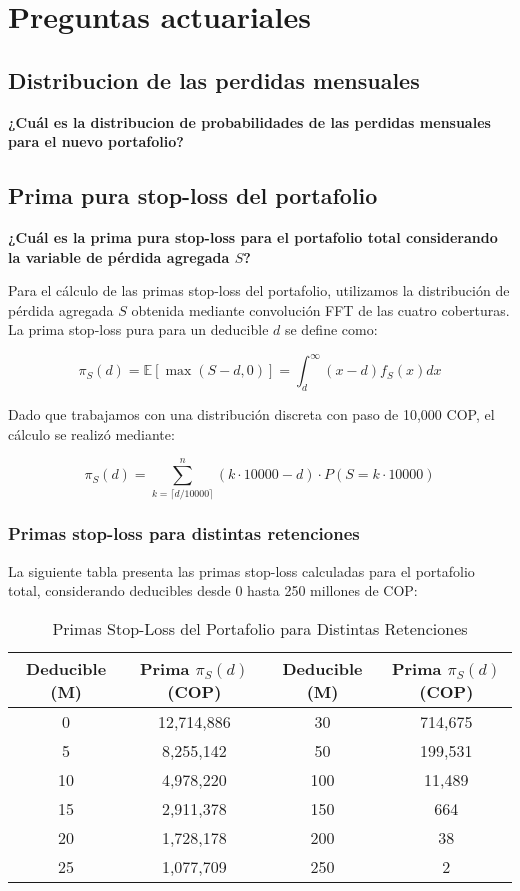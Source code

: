 \section{Preguntas actuariales}

\subsection{Distribucion de las perdidas mensuales}

\textbf{¿Cuál es la distribucion de probabilidades de las perdidas mensuales para el nuevo portafolio?}



\subsection{Prima pura stop-loss del portafolio}

\textbf{¿Cuál es la prima pura stop-loss para el portafolio total considerando la variable de pérdida agregada $S$?}

Para el cálculo de las primas stop-loss del portafolio, utilizamos la distribución de pérdida agregada $S$ obtenida mediante convolución FFT de las cuatro coberturas. La prima stop-loss pura para un deducible $d$ se define como:

$$\pi_S(d) = \mathbb{E}[\max(S - d, 0)] = \int_d^{\infty} (x - d) f_S(x) dx$$

Dado que trabajamos con una distribución discreta con paso de 10,000 COP, el cálculo se realizó mediante:

$$\pi_S(d) = \sum_{k=\lceil d/10000 \rceil}^{n} (k \cdot 10000 - d) \cdot P(S = k \cdot 10000)$$

\subsubsection{Primas stop-loss para distintas retenciones}

La siguiente tabla presenta las primas stop-loss calculadas para el portafolio total, considerando deducibles desde 0 hasta 250 millones de COP:

\begin{table}[H]
\centering
\caption{Primas Stop-Loss del Portafolio para Distintas Retenciones}
\begin{tabular}{|c|c|c|c|}
\hline
\textbf{Deducible (M)} & \textbf{Prima $\pi_S(d)$ (COP)} & \textbf{Deducible (M)} & \textbf{Prima $\pi_S(d)$ (COP)} \\
\hline
0 & 12,714,886 & 30 & 714,675 \\
5 & 8,255,142 & 50 & 199,531 \\
10 & 4,978,220 & 100 & 11,489 \\
15 & 2,911,378 & 150 & 664 \\
20 & 1,728,178 & 200 & 38 \\
25 & 1,077,709 & 250 & 2 \\
\hline
\end{tabular}
\end{table}

